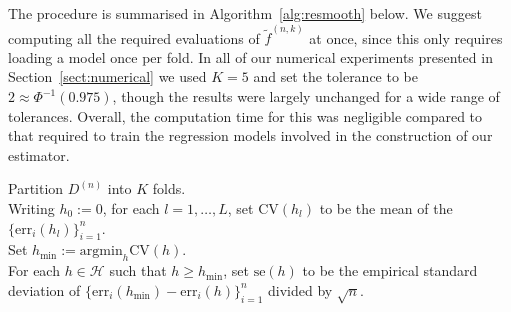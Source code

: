 \documentclass[aos]{imsart}
\begin{document}
	The procedure is summarised in Algorithm~\ref{alg:resmooth} below.
	We suggest computing all the required evaluations of $\tilde f^{(n,k)}$ at once, since this only requires loading a model once per fold. In all of our numerical experiments presented in Section~\ref{sect:numerical} we used $K=5$ and set the tolerance to be $2 \approx \Phi^{-1}(0.975)$, though the results were largely unchanged for a wide range of tolerances. Overall, the computation time for this was negligible compared to that required to train the regression models involved in the construction of our estimator.
	
\begin{algorithm}[h]
        Partition $D^{(n)}$ into $K$ folds.\\
		Writing $h_0 := 0$, for each $l=1,\ldots,L$, set $\text{CV}(h_l)$ to be the mean of the $\{\text{err}_i(h_l)\}_{i=1}^n$.\\
		Set $h_{\min} := \text{argmin}_h \text{CV}(h)$.\\
		For each $h \in \mathcal{H}$ such that $h \geq h_{\min}$, set $\text{se}(h)$ to be the empirical standard deviation of  $\{\text{err}_{i}(h_{\min}) - \text{err}_{i}(h)\}_{i=1}^n$ divided by $\sqrt{n}$.\\

\end{algorithm}
\end{document}
